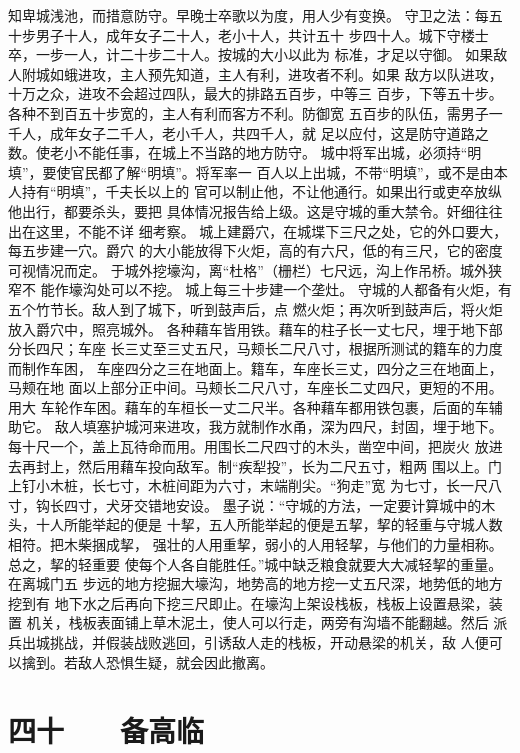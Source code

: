 \documentclass[12pt,UTF8]{ctexbook}
\begin{document}
知卑城浅池，而措意防守。早晚士卒歌以为度，用人少有变换。 
守卫之法：每五十步男子十人，成年女子二十人，老小十人，共计五十 
步四十人。城下守楼士卒，一步一人，计二十步二十人。按城的大小以此为 
标准，才足以守御。 
如果敌人附城如蛾进攻，主人预先知道，主人有利，进攻者不利。如果 
敌方以队进攻，十万之众，进攻不会超过四队，最大的排路五百步，中等三 
百步，下等五十步。各种不到百五十步宽的，主人有利而客方不利。防御宽 
五百步的队伍，需男子一千人，成年女子二千人，老小千人，共四千人，就 
足以应付，这是防守道路之数。使老小不能任事，在城上不当路的地方防守。 
城中将军出城，必须持“明填”，要使官民都了解“明填”。将军率一 
百人以上出城，不带“明填”，或不是由本人持有“明填”，千夫长以上的 
官可以制止他，不让他通行。如果出行或吏卒放纵他出行，都要杀头，要把 
具体情况报告给上级。这是守城的重大禁令。奸细往往出在这里，不能不详 
细考察。 
城上建爵穴，在城堞下三尺之处，它的外口要大，每五步建一穴。爵穴 
的大小能放得下火炬，高的有六尺，低的有三尺，它的密度可视情况而定。 
于城外挖壕沟，离“杜格”（栅栏）七尺远，沟上作吊桥。城外狭窄不 
能作壕沟处可以不挖。 
城上每三十步建一个垄灶。 
守城的人都备有火炬，有五个竹节长。敌人到了城下，听到鼓声后，点 
燃火炬；再次听到鼓声后，将火炬放入爵穴中，照亮城外。 
各种藉车皆用铁。藉车的柱子长一丈七尺，埋于地下部分长四尺；车座 
长三丈至三丈五尺，马颊长二尺八寸，根据所测试的籍车的力度而制作车困， 
车座四分之三在地面上。籍车，车座长三丈，四分之三在地面上，马颊在地 
面以上部分正中间。马颊长二尺八寸，车座长二丈四尺，更短的不用。用大 
车轮作车困。藉车的车桓长一丈二尺半。各种藉车都用铁包裹，后面的车辅 
助它。 
敌人填塞护城河来进攻，我方就制作水甬，深为四尺，封固，埋于地下。 
每十尺一个，盖上瓦待命而用。用围长二尺四寸的木头，凿空中间，把炭火 
放进去再封上，然后用藉车投向敌军。制“疾犁投”，长为二尺五寸，粗两 
围以上。门上钉小木桩，长七寸，木桩间距为六寸，末端削尖。“狗走”宽 
为七寸，长一尺八寸，钩长四寸，犬牙交错地安设。 
墨子说：“守城的方法，一定要计算城中的木头，十人所能举起的便是 
十挈，五人所能举起的便是五挈，挈的轻重与守城人数相符。把木柴捆成挈， 
强壮的人用重挈，弱小的人用轻挈，与他们的力量相称。总之，挈的轻重要 
使每个人各自能胜任。”城中缺乏粮食就要大大减轻挈的重量。在离城门五 
步远的地方挖掘大壕沟，地势高的地方挖一丈五尺深，地势低的地方挖到有 
地下水之后再向下挖三尺即止。在壕沟上架设栈板，栈板上设置悬梁，装置 
机关，栈板表面铺上草木泥土，使人可以行走，两旁有沟墙不能翻越。然后 
派兵出城挑战，并假装战败逃回，引诱敌人走的栈板，开动悬梁的机关，敌 
人便可以擒到。若敌人恐惧生疑，就会因此撤离。 

\chapter{四十　　备高临}
\end{document}

